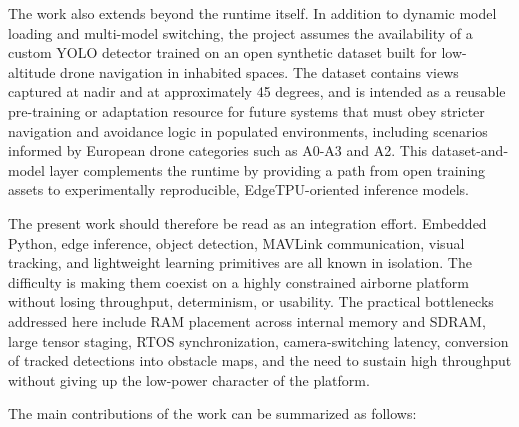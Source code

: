 The work also extends beyond the runtime itself. In addition to dynamic
model loading and multi-model switching, the project assumes the
availability of a custom YOLO detector trained on an open synthetic
dataset built for low-altitude drone navigation in inhabited spaces. The
dataset contains views captured at nadir and at approximately 45
degrees, and is intended as a reusable pre-training or adaptation
resource for future systems that must obey stricter navigation and
avoidance logic in populated environments, including scenarios informed
by European drone categories such as A0-A3 and A2. This
dataset-and-model layer complements the runtime by providing a path from
open training assets to experimentally reproducible, EdgeTPU-oriented
inference models.

The present work should therefore be read as an integration effort.
Embedded Python, edge inference, object detection, MAVLink
communication, visual tracking, and lightweight learning primitives are
all known in isolation. The difficulty is making them coexist on a
highly constrained airborne platform without losing throughput,
determinism, or usability. The practical bottlenecks addressed here
include RAM placement across internal memory and SDRAM, large tensor
staging, RTOS synchronization, camera-switching latency, conversion of
tracked detections into obstacle maps, and the need to sustain high
throughput without giving up the low-power character of the platform.

The main contributions of the work can be summarized as follows:

